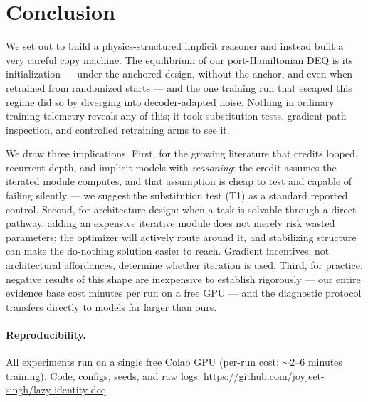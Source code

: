 \documentclass[11pt]{article}
\begin{document}
\section{Conclusion}\label{sec:conclusion}
We set out to build a physics-structured implicit reasoner and instead
built a very careful copy machine. The equilibrium of our
port-Hamiltonian DEQ is its initialization --- under the anchored
design, without the anchor, and even when retrained from randomized
starts --- and the one training run that escaped this regime did so by
diverging into decoder-adapted noise. Nothing in ordinary training
telemetry reveals any of this; it took substitution tests,
gradient-path inspection, and controlled retraining arms to see it.

We draw three implications. First, for the growing literature that
credits looped, recurrent-depth, and implicit models with
\emph{reasoning}: the credit assumes the iterated module computes,
and that assumption is cheap to test and capable of failing silently
--- we suggest the substitution test (T1) as a standard reported
control. Second, for architecture design: when a task is solvable
through a direct pathway, adding an expensive iterative module does
not merely risk wasted parameters; the optimizer will actively route
around it, and stabilizing structure can make the do-nothing solution
easier to reach. Gradient incentives, not architectural affordances,
determine whether iteration is used. Third, for practice: negative
results of this shape are inexpensive to establish rigorously --- our
entire evidence base cost minutes per run on a free GPU --- and the
diagnostic protocol transfers directly to models far larger than
ours.

\paragraph{Reproducibility.} All experiments run on a single free
Colab GPU (per-run cost: $\sim$2--6 minutes training). Code, configs,
seeds, and raw logs: \url{https://github.com/joyjeet-singh/lazy-identity-deq}




\appendix
\end{document}
